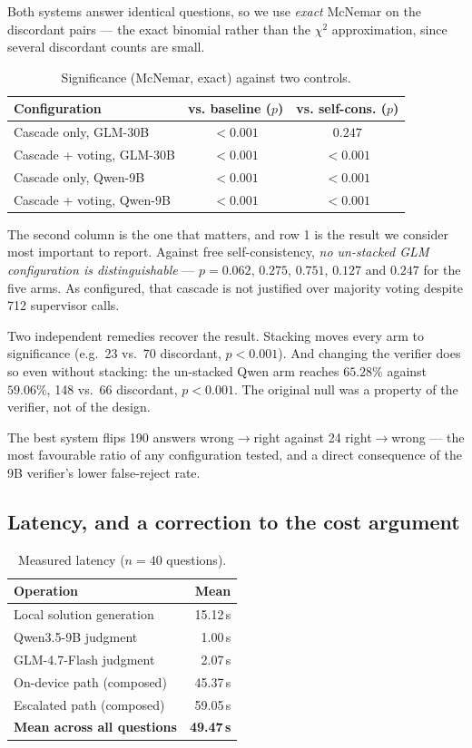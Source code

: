 \documentclass[conference]{IEEEtran}
\begin{document}
Both systems answer identical questions, so we use \emph{exact} McNemar on the discordant
pairs --- the exact binomial rather than the $\chi^2$ approximation, since several
discordant counts are small.

\begin{table}[t]
\caption{Significance (McNemar, exact) against two controls.}
\label{tab:sig}
\centering
\small
\begin{tabular}{@{}lcc@{}}
\toprule
Configuration & vs. baseline ($p$) & vs. self-cons. ($p$) \\
\midrule
Cascade only, GLM-30B & $<0.001$ & $\mathbf{0.247}$ \\
Cascade + voting, GLM-30B & $<0.001$ & $<0.001$ \\
Cascade only, Qwen-9B & $<0.001$ & $<0.001$ \\
Cascade + voting, Qwen-9B & $<0.001$ & $<0.001$ \\
\bottomrule
\end{tabular}
\end{table}

The second column is the one that matters, and row 1 is the result we consider most
important to report. Against free self-consistency, \emph{no un-stacked GLM configuration
is distinguishable} --- $p=0.062$, $0.275$, $0.751$, $0.127$ and $0.247$ for the five arms.
As configured, that cascade is not justified over majority voting despite 712 supervisor
calls.

Two independent remedies recover the result. Stacking moves every arm to significance
(e.g.\ 23 vs.\ 70 discordant, $p<0.001$). And changing the verifier does so even without
stacking: the un-stacked Qwen arm reaches $65.28\%$ against $59.06\%$, 148 vs.\ 66
discordant, $p<0.001$. The original null was a property of the verifier, not of the design.

The best system flips 190 answers wrong$\rightarrow$right against 24
right$\rightarrow$wrong --- the most favourable ratio of any configuration tested, and a
direct consequence of the 9B verifier's lower false-reject rate.

\subsection{Latency, and a correction to the cost argument}

\begin{table}[t]
\caption{Measured latency ($n=40$ questions).}
\label{tab:latency}
\centering
\small
\begin{tabular}{@{}lr@{}}
\toprule
Operation & Mean \\
\midrule
Local solution generation & 15.12\,s \\
Qwen3.5-9B judgment & 1.00\,s \\
GLM-4.7-Flash judgment & 2.07\,s \\
On-device path (composed) & 45.37\,s \\
Escalated path (composed) & 59.05\,s \\
\textbf{Mean across all questions} & \textbf{49.47\,s} \\
\bottomrule
\end{tabular}
\end{table}
\end{document}
